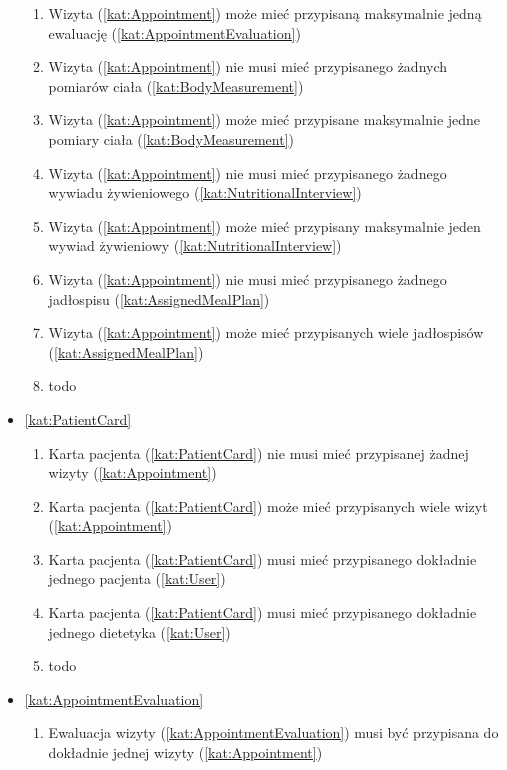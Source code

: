 \begin{itemize}[label={\textbf{Reguły dla}}, wide, labelwidth=!, labelindent=0pt]
\begin{enumerate}[label={\textbf{REG/\protect\threedigits{\arabic{enumi}}}}, wide, labelwidth=!, align=left, leftmargin=3cm, resume]
        \item Wizyta (\ref{kat:Appointment}) może mieć przypisaną maksymalnie jedną ewaluację (\ref{kat:AppointmentEvaluation})
        \item Wizyta (\ref{kat:Appointment}) nie musi mieć przypisanego żadnych pomiarów ciała (\ref{kat:BodyMeasurement})
        \item Wizyta (\ref{kat:Appointment}) może mieć przypisane maksymalnie jedne pomiary ciała (\ref{kat:BodyMeasurement})
        \item Wizyta (\ref{kat:Appointment}) nie musi mieć przypisanego żadnego wywiadu żywieniowego (\ref{kat:NutritionalInterview})
        \item Wizyta (\ref{kat:Appointment}) może mieć przypisany maksymalnie jeden wywiad żywieniowy (\ref{kat:NutritionalInterview})
        \item Wizyta (\ref{kat:Appointment}) nie musi mieć przypisanego żadnego jadłospisu (\ref{kat:AssignedMealPlan})
        \item Wizyta (\ref{kat:Appointment}) może mieć przypisanych wiele jadłospisów (\ref{kat:AssignedMealPlan})
        \item todo
    \end{enumerate}
    \item\ref{kat:PatientCard}
    \begin{enumerate}[label={\textbf{REG/\protect\threedigits{\arabic{enumi}}}}, wide, labelwidth=!, align=left, leftmargin=3cm, resume]
        \item Karta pacjenta (\ref{kat:PatientCard}) nie musi mieć przypisanej żadnej wizyty (\ref{kat:Appointment})
        \item Karta pacjenta (\ref{kat:PatientCard}) może mieć przypisanych wiele wizyt (\ref{kat:Appointment})
        \item Karta pacjenta (\ref{kat:PatientCard}) musi mieć przypisanego dokładnie jednego pacjenta (\ref{kat:User})
        \item Karta pacjenta (\ref{kat:PatientCard}) musi mieć przypisanego dokładnie jednego dietetyka (\ref{kat:User})
        \item todo
    \end{enumerate}
    \item\ref{kat:AppointmentEvaluation}
    \begin{enumerate}[label={\textbf{REG/\protect\threedigits{\arabic{enumi}}}}, wide, labelwidth=!, align=left, leftmargin=3cm, resume]
        \item Ewaluacja wizyty (\ref{kat:AppointmentEvaluation}) musi być przypisana do dokładnie jednej wizyty (\ref{kat:Appointment})

\end{enumerate}
\end{itemize}
